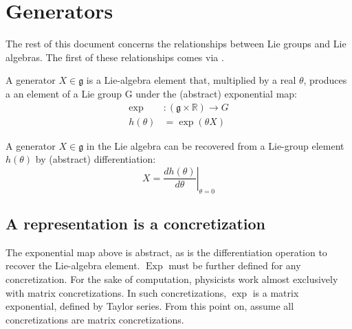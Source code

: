 %

\chapter{Generators}

\noindent The rest of this document concerns the relationships between Lie
groups and Lie algebras. The first of these relationships comes via 
.

\begin{definition}[Generator]
    A generator $X\in\mathfrak{g}$ is a Lie-algebra element that, multiplied by
    a real $\theta$,
produces a an element of a Lie group G under the (abstract) exponential map:
    \begin{align*}
        \exp &: (\mathfrak{g} \times \mathbb{R}) \rightarrow G \\
        h(\theta) &= \exp(\theta{}X)
    \end{align*}
\end{definition}

\begin{remark} A generator $X\in\mathfrak{g}$ in the Lie algebra can be recovered 
    from a Lie-group element $h(\theta)$ by (abstract) differentiation: 
    \begin{equation*}
        X = \left.\frac{d h(\theta)}{d \theta}\right|_{\theta=0}
    \end{equation*}
\end{remark}

\section{A representation is a concretization}

The exponential map above is abstract, as is the differentiation operation to
recover the Lie-algebra element. $\operatorname{Exp}$ must be further defined
for any concretization. For the sake of computation, physicists work almost
exclusively with matrix concretizations. In such concretizations, $\exp$ is a
matrix exponential, defined by Taylor series. From this point on, assume all
concretizations are matrix concretizations. 

